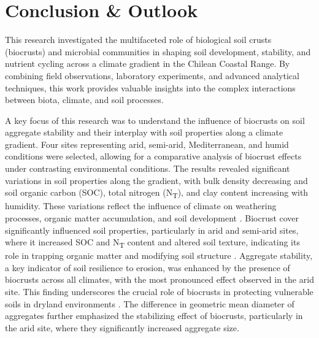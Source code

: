 \chapter{Conclusion \& Outlook}

This research investigated the multifaceted role of biological soil crusts (biocrusts) and microbial communities in shaping soil development, stability, and nutrient cycling across a climate gradient in the Chilean Coastal Range. By combining field observations, laboratory experiments, and advanced analytical techniques, this work provides valuable insights into the complex interactions between biota, climate, and soil processes.

A key focus of this research was to understand the influence of biocrusts on soil aggregate stability and their interplay with soil properties along a climate gradient. Four sites representing arid, semi-arid, Mediterranean, and humid conditions were selected, allowing for a comparative analysis of biocrust effects under contrasting environmental conditions. The results revealed significant variations in soil properties along the gradient, with bulk density decreasing and soil organic carbon (SOC), total nitrogen (N\textsubscript{T}), and clay content increasing with humidity. These variations reflect the influence of climate on weathering processes, organic matter accumulation, and soil development \cite{Jenny1941}. Biocrust cover significantly influenced soil properties, particularly in arid and semi-arid sites, where it increased SOC and N\textsubscript{T} content and altered soil texture, indicating its role in trapping organic matter and modifying soil structure \citep{Belnap2003,Bowker2006}. Aggregate stability, a key indicator of soil resilience to erosion, was enhanced by the presence of biocrusts across all climates, with the most pronounced effect observed in the arid site. This finding underscores the crucial role of biocrusts in protecting vulnerable soils in dryland environments \citep{Chamizo2012}. The difference in geometric mean diameter of aggregates further emphasized the stabilizing effect of biocrusts, particularly in the arid site, where they significantly increased aggregate size.

